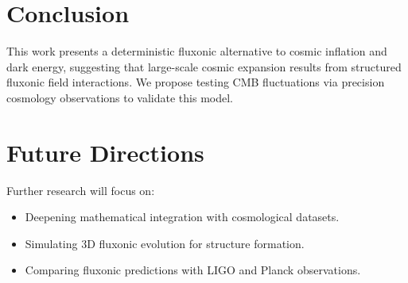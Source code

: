 \documentclass{article}
\begin{document}
\section{Conclusion}
This work presents a deterministic fluxonic alternative to cosmic inflation and dark energy, suggesting that large-scale cosmic expansion results from structured fluxonic field interactions. We propose testing CMB fluctuations via precision cosmology observations to validate this model.

\section{Future Directions}
Further research will focus on:
\begin{itemize}
    \item Deepening mathematical integration with cosmological datasets.
    \item Simulating 3D fluxonic evolution for structure formation.
    \item Comparing fluxonic predictions with LIGO and Planck observations.
\end{itemize}
\end{document}

